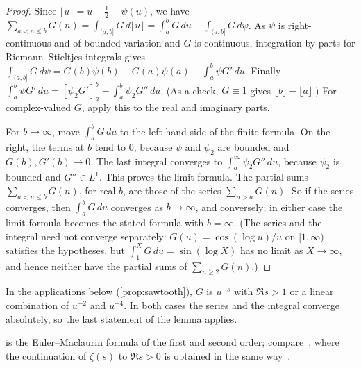 \begin{proof}
Since $\lfloor u\rfloor=u-\frac12-\psi(u)$, we have $\sum_{a<n\le b}G(n)=\int_{(a,b]}G\,d\lfloor u\rfloor=\int_a^bG\,du-\int_{(a,b]}G\,d\psi$. As $\psi$ is right-continuous and of bounded variation and $G$ is continuous, integration by parts for Riemann--Stieltjes integrals gives $\int_{(a,b]}G\,d\psi=G(b)\psi(b)-G(a)\psi(a)-\int_a^b\psi G'\,du$. Finally $\int_a^b\psi G'\,du=[\psi_2G']_a^b-\int_a^b\psi_2G''\,du$. (As a check, $G\equiv1$ gives $\lfloor b\rfloor-\lfloor a\rfloor$.) For complex-valued $G$, apply this to the real and imaginary parts.

For $b\to\infty$, move $\int_a^bG\,du$ to the left-hand side of the finite formula. On the right, the terms at $b$ tend to $0$, because $\psi$ and $\psi_2$ are bounded and $G(b),G'(b)\to0$. The last integral converges to $\int_a^\infty\psi_2G''\,du$, because $\psi_2$ is bounded and $G''\in L^1$. This proves the limit formula. The partial sums $\sum_{a<n\le b}G(n)$, for real $b$, are those of the series $\sum_{n>a}G(n)$. So if the series converges, then $\int_a^bG\,du$ converges as $b\to\infty$, and conversely; in either case the limit formula becomes the stated formula with $b=\infty$. (The series and the integral need not converge separately: $G(u)=\cos(\log u)/u$ on $[1,\infty)$ satisfies the hypotheses, but $\int_1^XG\,du=\sin(\log X)$ has no limit as $X\to\infty$, and hence neither have the partial sums of $\sum_{n\ge2}G(n)$.)
\end{proof}

In the applications below (\cref{prop:sawtooth}), $G$ is $u^{-s}$ with $\Re s>1$ or a linear combination of $u^{-2}$ and $u^{-4}$. In both cases the series and the integral converge absolutely, so the last statement of the lemma applies.

 is the Euler--Maclaurin formula of the first and second order; compare~\cite[§1.3]{MV2007}, where the continuation of $\zeta(s)$ to $\Re s>0$ is obtained in the same way~\cite[Theorem~1.12]{MV2007}.
